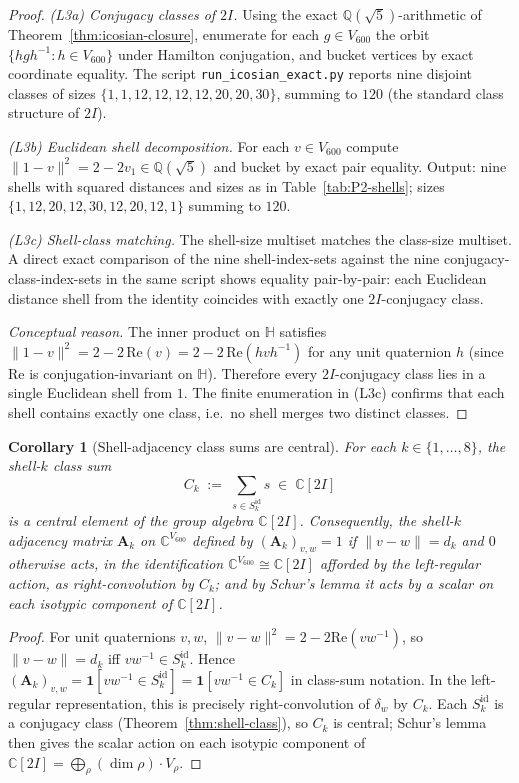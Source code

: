 \documentclass[11pt, a4paper]{amsart}
\newtheorem{corollary}[theorem]{Corollary}
\theoremstyle{definition}
\newcommand{\Q}{\mathbb{Q}}
\newcommand{\C}{\mathbb{C}}
\newcommand{\HH}{\mathbb{H}}
\begin{document}
\begin{proof}
\emph{(L3a) Conjugacy classes of $2I$.} Using the exact $\Q(\sqrt
5)$-arithmetic of Theorem~\ref{thm:icosian-closure}, enumerate for
each $g \in V_{600}$ the orbit $\{h g h^{-1} : h \in V_{600}\}$
under Hamilton conjugation, and bucket vertices by exact
coordinate equality. The script
\texttt{run\_icosian\_exact.py} reports nine disjoint classes of
sizes $\{1, 1, 12, 12, 12, 12, 20, 20, 30\}$, summing to $120$
(the standard class structure of $2I$).

\emph{(L3b) Euclidean shell decomposition.} For each $v \in
V_{600}$ compute $\|1 - v\|^2 = 2 - 2 v_1 \in \Q(\sqrt 5)$ and
bucket by exact pair equality. Output: nine shells with squared
distances and sizes as in Table~\ref{tab:P2-shells}; sizes $\{1,
12, 20, 12, 30, 12, 20, 12, 1\}$ summing to $120$.

\emph{(L3c) Shell-class matching.} The shell-size multiset matches
the class-size multiset. A direct exact comparison of the nine
shell-index-sets against the nine conjugacy-class-index-sets in
the same script shows equality pair-by-pair: each Euclidean
distance shell from the identity coincides with exactly one
$2I$-conjugacy class.

\emph{Conceptual reason.} The inner product on $\HH$ satisfies
$\|1 - v\|^2 = 2 - 2\,\mathrm{Re}(v) = 2 - 2\,\mathrm{Re}(h v
h^{-1})$ for any unit quaternion $h$ (since
$\mathrm{Re}$ is conjugation-invariant on $\HH$). Therefore every
$2I$-conjugacy class lies in a single Euclidean shell from $1$.
The finite enumeration in (L3c) confirms that each shell contains
exactly one class, i.e.\ no shell merges two distinct classes.
\end{proof}

\begin{corollary}[Shell-adjacency class sums are central]
\label{cor:class-sums-central}
For each $k \in \{1, \ldots, 8\}$, the \emph{shell-$k$ class sum}
\[
  C_k \;:=\; \sum_{s \in S_k^{\mathrm{id}}} s \;\in\; \C[2I]
\]
is a central element of the group algebra $\C[2I]$. Consequently,
the \emph{shell-$k$ adjacency matrix} $\mathbf{A}_k$ on
$\C^{V_{600}}$ defined by $(\mathbf{A}_k)_{v, w} = 1$ if
$\|v - w\| = d_k$ and $0$ otherwise acts, in the identification
$\C^{V_{600}} \cong \C[2I]$ afforded by the left-regular action,
as \emph{right-convolution by $C_k$}; and by Schur's lemma it acts
by a scalar on each isotypic component of $\C[2I]$.
\end{corollary}

\begin{proof}
For unit quaternions $v, w$, $\|v - w\|^2 = 2 - 2 \mathrm{Re}(v
w^{-1})$, so $\|v - w\| = d_k$ iff $v w^{-1} \in S_k^{\mathrm{id}}$.
Hence $(\mathbf{A}_k)_{v, w} = \mathbf{1}[v w^{-1} \in
S_k^{\mathrm{id}}] = \mathbf{1}[v w^{-1} \in C_k]$ in class-sum
notation. In the left-regular representation, this is precisely
right-convolution of $\delta_w$ by $C_k$. Each $S_k^{\mathrm{id}}$
is a conjugacy class (Theorem~\ref{thm:shell-class}), so $C_k$ is
central; Schur's lemma then gives the scalar action on each
isotypic component of $\C[2I] = \bigoplus_\rho (\dim\rho) \cdot
V_\rho$.
\end{proof}
\end{document}
